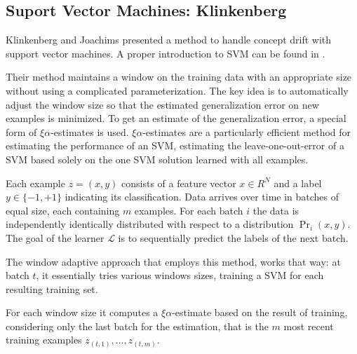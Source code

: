 \subsection{Suport Vector Machines: Klinkenberg}

Klinkenberg and Joachims \cite{Klinkenberg} presented a method to handle concept drift with support vector machines. A proper introduction to SVM can be found in \cite{Burguess}.

Their method maintains a window on the training data with an appropriate size without using a complicated parameterization. The key idea is to automatically adjust the window size so that the estimated generalization error on new examples is minimized. To get an estimate of the generalization error, a special form of $\xi \alpha$-estimates is used. $\xi \alpha$-estimates are a particularly efficient method for estimating the performance of an SVM, estimating the leave-one-out-error of a SVM based solely 
on the one SVM solution learned with all examples.

Each example $z=(x,y)$ consists of a feature vector
$x \in R^N$ and a label $y \in \{-1,+1\}$ indicating its classification. Data arrives over time in batches of equal size,
each containing $m$ examples.
 For each batch $i$ the data is independently identically distributed with respect to a distribution $\Pr_i(x,y)$. The goal of the learner $\mathcal{L}$ is to sequentially predict the labels of the next batch.
 
 The window adaptive approach that employs this method, works that way:  
 at batch $t$, it essentially tries various windows sizes, training a SVM for each resulting training set.


For each window size it computes a $\xi \alpha$-estimate based on the result of training, considering only the last batch for the estimation, that is the $m$ most recent training examples $z_{(t,1)}, \ldots, z_{(t,m)}$.

